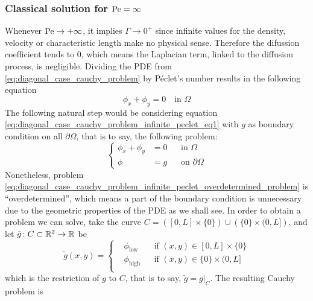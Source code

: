 \subsubsection{Classical solution for \texorpdfstring{$\mathrm{Pe} =
\infty$}{infinite Péclet's number}}

Whenever $\mathrm{Pe} \to +\infty$, it implies $\Gamma \to 0^+$ since infinite
values for the density, velocity or characteristic length make no physical
sense. Therefore the difussion coefficient tends to $0$, which means the
Laplacian term, linked to the diffusion process, is negligible. Dividing the PDE
from \eqref{eq:diagonal_case_cauchy_problem} by Péclet's number results in the
following equation
\begin{equation} \label{eq:diagonal_case_cauchy_problem_infinite_peclet_eq1}
	\phi_x + \phi_y = 0 \quad \text{in } \Omega
\end{equation}
The following natural step would be considering equation
\eqref{eq:diagonal_case_cauchy_problem_infinite_peclet_eq1} with $g$ as boundary
condition on all $\partial \Omega$, that is to say, the following problem:
\begin{equation} \label{eq:diagonal_case_cauchy_problem_infinite_peclet_overdetermined_problem}
	\left\{
	\begin{aligned}
		\phi_x + \phi_y &= 0 &
		&\text{in } \Omega \\
		\phi &= g &
		&\text{on } \partial \Omega
	\end{aligned}
	\right.
\end{equation}
Nonetheless, problem
\eqref{eq:diagonal_case_cauchy_problem_infinite_peclet_overdetermined_problem}
is ``overdetermined'', which means a part of the boundary condition is
unnecessary due to the geometric properties of the PDE as we shall see. In order
to obtain a problem we can solve, take the curve $C = \left( [0,L] \times \{ 0
\} \right) \cup \left( \{ 0 \} \times (0,L] \right)$, and let $\tilde{g} \colon
C \subset \mathbb{R}^2 \rightarrow \mathbb{R}$ be
\begin{equation*}
	\tilde{g}(x,y) = 
	\left\{
	\begin{aligned}
		&\phi_\text{low} 	& &\text{if } (x,y) \in [0,L] \times \{ 0 \} \\
		&\phi_\text{high} 	& &\text{if } (x,y) \in \{ 0 \} \times (0,L] \\
	\end{aligned}
	\right.
\end{equation*}
which is the restriction of $g$ to $C$, that is to say, $\tilde{g} = g
\rvert_C$. The resulting Cauchy problem is
